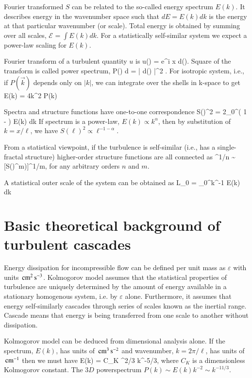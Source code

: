 \documentclass[usenatbib,twocolumn]{aastex63}
\newcommand{\ene}[2]{\mathcal{E}_{#1}^{#2}} %
\begin{document}
Fourier transformed $S$ can be related to the so-called energy spectrum $E(k)$.
It describes energy in the wavenumber space such that $dE = E(k) dk$ is the energy at that particular wavenumber (or scale).
Total energy is obtained by summing over all scales, $\ene{}{} = \int E(k) dk$.
For a statistically self-similar system we expect a power-law scaling for $E(k)$.


Fourier transform of a turbulent quantity $u$ is
\be
u(\vec{\ell}) = \int e^{i  x} d().
\ee
Square of the transform is called power spectrum,
\be
P() d = \langle | d() |^2 \rangle.
\ee
For isotropic system, i.e., if $P(\vec{k})$ depends only on $|k|$, we can integrate over the shells in k-space to get
\be
E(k) = 4\pi k^2 P(k)
\ee

Spectra and structure functions have one-to-one correspondence
\be
S(\ell)^2 = 2\int_0^\infty \left( 1 - \right) E(k) dk
\ee
If spectrum is a power-law, $E(k) \propto k^\alpha$, then by substitution of $k = x/\ell$, we have $S(\ell)^2 \propto \ell^{-1-\alpha}$.

From a statistical viewpoint, if the turbulence is self-similar (i.e., has a single-fractal structure) higher-order structure functions are all connected as 
\be
[S(\ell)^n)]^{1/n} \sim [S(\ell)^m)]^{1/m},
\ee
for any arbitrary orders $n$ and $m$.


A statistical outer scale of the system can be obtained as
\be
L_0 =  \int_0^\infty k^{-1} E(k) dk
\ee




\section{Basic theoretical background of turbulent cascades}\label{sect:theory}

Energy dissipation for incompressible flow can be defined per unit mass as $\varepsilon$ with units $\, \mathrm{cm}^2 \, \mathrm{s}^{-3}$.
Kolmogorov model assumes that the statistical properties of turbulence are uniquely determined by the amount of energy available in a stationary homogenous system, i.e. by $\varepsilon$ alone.
Furthermore, it assumes that energy self-similarly cascades through series of scales known as the inertial range.
Cascade means that energy is being transferred from one scale to another without dissipation.

Kolmogorov model can be deduced from dimensional analysis alone.
If the spectrum, $E(k)$, has units of $\, \mathrm{cm}^3 \, \mathrm{s}^{-2}$ and wavenumber, $k = 2\pi/\ell$, has units of $\, \mathrm{cm}^{-1}$ then we must have
\be
E(k) = C_K \varepsilon^{2/3} k^{-5/3},
\ee
where $C_K$ is a dimensionless Kolmogorov constant.
The $3D$ powerspectrum $P(k) \sim E(k) k^{-2} \sim k^{-11/3}$.
\end{document}
